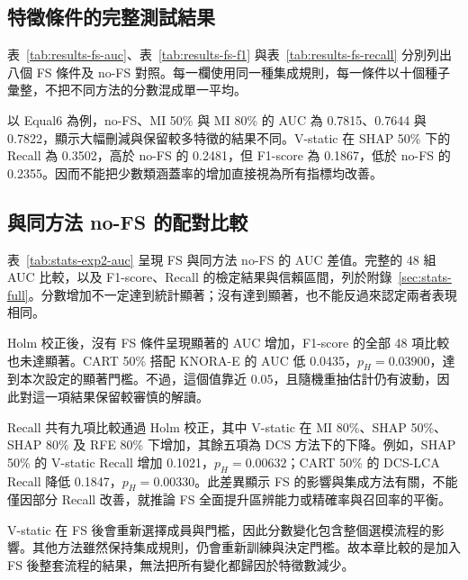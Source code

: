 \subsection{特徵條件的完整測試結果}

表~\ref{tab:results-fs-auc}、表~\ref{tab:results-fs-f1} 與表~\ref{tab:results-fs-recall} 分別列出八個 FS 條件及 no-FS 對照。每一欄使用同一種集成規則，每一條件以十個種子彙整，不把不同方法的分數混成單一平均。





以 Equal6 為例，no-FS、MI 50\% 與 MI 80\% 的 AUC 為 0.7815、0.7644 與 0.7822，顯示大幅刪減與保留較多特徵的結果不同。V-static 在 SHAP 50\% 下的 Recall 為 0.3502，高於 no-FS 的 0.2481，但 F1-score 為 0.1867，低於 no-FS 的 0.2355。因而不能把少數類涵蓋率的增加直接視為所有指標均改善。

\subsection{與同方法 no-FS 的配對比較}



表~\ref{tab:stats-exp2-auc} 呈現 FS 與同方法 no-FS 的 AUC 差值。完整的 48 組 AUC 比較，以及 F1-score、Recall 的檢定結果與信賴區間，列於附錄~\ref{sec:stats-full}。分數增加不一定達到統計顯著；沒有達到顯著，也不能反過來認定兩者表現相同。

Holm 校正後，沒有 FS 條件呈現顯著的 AUC 增加，F1-score 的全部 48 項比較也未達顯著。CART 50\% 搭配 KNORA-E 的 AUC 低 0.0435，\(p_H=0.03900\)，達到本次設定的顯著門檻。不過，這個值靠近 0.05，且隨機重抽估計仍有波動，因此對這一項結果保留較審慎的解讀。

Recall 共有九項比較通過 Holm 校正，其中 V-static 在 MI 80\%、SHAP 50\%、SHAP 80\% 及 RFE 80\% 下增加，其餘五項為 DCS 方法下的下降。例如，SHAP 50\% 的 V-static Recall 增加 0.1021，\(p_H=0.00632\)；CART 50\% 的 DCS-LCA Recall 降低 0.1847，\(p_H=0.00330\)。此差異顯示 FS 的影響與集成方法有關，不能僅因部分 Recall 改善，就推論 FS 全面提升區辨能力或精確率與召回率的平衡。

V-static 在 FS 後會重新選擇成員與門檻，因此分數變化包含整個選模流程的影響。其他方法雖然保持集成規則，仍會重新訓練與決定門檻。故本章比較的是加入 FS 後整套流程的結果，無法把所有變化都歸因於特徵數減少。

